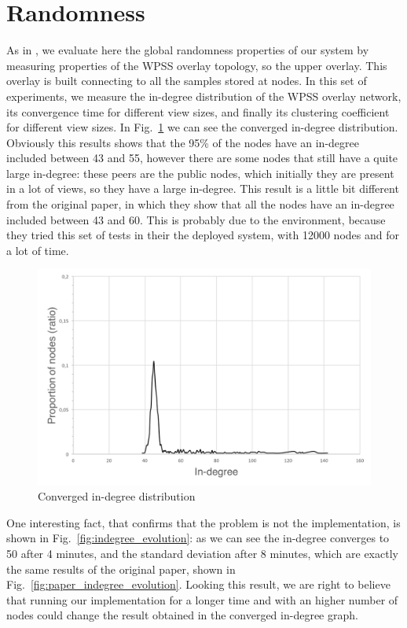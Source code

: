 \section{Randomness}
\label{sec:eval_randomness}
As in \cite{wormhole}, we evaluate here the global randomness properties of our system by measuring properties of the WPSS overlay topology, so the upper overlay. This overlay is built connecting to all the samples stored at nodes. In this set of experiments, we measure the in-degree distribution of the WPSS overlay network, its convergence time for different view sizes, and finally its clustering coefficient for different view sizes. In Fig.~\ref{fig:converged_indegree} we can see the converged in-degree distribution. Obviously this results shows that the 95\% of the nodes have an in-degree included between 43 and 55, however there are some nodes that still have a quite large in-degree: these peers are the public nodes, which initially they are present in a lot of views, so they have a large in-degree. This result is a little bit different from the original paper, in which they show that all the nodes have an in-degree included between 43 and 60. This is probably due to the environment, because they tried this set of tests in their the deployed system, with 12000 nodes and for a lot of time. 
\begin{figure}[ht]
  \centering
  \includegraphics[keepaspectratio=true, width=\textwidth]{images/converged_indegree}\caption{Converged in-degree distribution}
  \label{fig:converged_indegree}
\end{figure}

One interesting fact, that confirms that the problem is not the implementation, is shown in Fig.~\ref{fig:indegree_evolution}: as we can see the in-degree converges to 50 after 4 minutes, and the standard deviation after 8 minutes, which are exactly the same results of the original paper, shown in Fig.~\ref{fig:paper_indegree_evolution}. Looking this result, we are right to believe that running our implementation for a longer time and with an higher number of nodes could change the result obtained in the converged in-degree graph.


